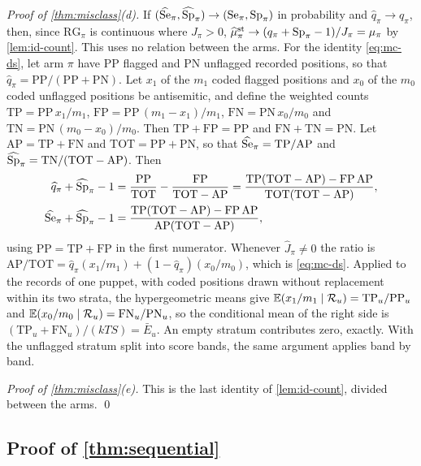 \emph{Proof of \cref{thm:misclass}(d).} If $(\widehat{\mathrm{Se}}_\pi,\widehat{\mathrm{Sp}}_\pi)\to(\mathrm{Se}_\pi,\mathrm{Sp}_\pi)$ in probability and $\widehat q_\pi\to q_\pi$, then, since $\mathrm{RG}_\pi$ is continuous where $J_\pi>0$, $\widehat\mu^{\mathrm{st}}_\pi\to(q_\pi+\mathrm{Sp}_\pi-1)/J_\pi=\mu_\pi$ by \cref{lem:id-count}. This uses no relation between the arms. For the identity \eqref{eq:mc-ds}, let arm $\pi$ have $\mathrm{PP}$ flagged and $\mathrm{PN}$ unflagged recorded positions, so that $\widehat q_\pi=\mathrm{PP}/(\mathrm{PP}+\mathrm{PN})$. Let $x_1$ of the $m_1$ coded flagged positions and $x_0$ of the $m_0$ coded unflagged positions be antisemitic, and define the weighted counts $\mathrm{TP}=\mathrm{PP}\,x_1/m_1$, $\mathrm{FP}=\mathrm{PP}\,(m_1-x_1)/m_1$, $\mathrm{FN}=\mathrm{PN}\,x_0/m_0$ and $\mathrm{TN}=\mathrm{PN}\,(m_0-x_0)/m_0$. Then $\mathrm{TP}+\mathrm{FP}=\mathrm{PP}$ and $\mathrm{FN}+\mathrm{TN}=\mathrm{PN}$. Let $\mathrm{AP}=\mathrm{TP}+\mathrm{FN}$ and $\mathrm{TOT}=\mathrm{PP}+\mathrm{PN}$, so that $\widehat{\mathrm{Se}}_\pi=\mathrm{TP}/\mathrm{AP}$ and $\widehat{\mathrm{Sp}}_\pi=\mathrm{TN}/(\mathrm{TOT}-\mathrm{AP})$. Then
\begin{align*}
  \widehat q_\pi+\widehat{\mathrm{Sp}}_\pi-1&=\frac{\mathrm{PP}}{\mathrm{TOT}}-\frac{\mathrm{FP}}{\mathrm{TOT}-\mathrm{AP}}=\frac{\mathrm{TP}(\mathrm{TOT}-\mathrm{AP})-\mathrm{FP}\,\mathrm{AP}}{\mathrm{TOT}(\mathrm{TOT}-\mathrm{AP})},\\
  \widehat{\mathrm{Se}}_\pi+\widehat{\mathrm{Sp}}_\pi-1&=\frac{\mathrm{TP}(\mathrm{TOT}-\mathrm{AP})-\mathrm{FP}\,\mathrm{AP}}{\mathrm{AP}(\mathrm{TOT}-\mathrm{AP})},
\end{align*}
using $\mathrm{PP}=\mathrm{TP}+\mathrm{FP}$ in the first numerator. Whenever $\widehat J_\pi\neq0$ the ratio is $\mathrm{AP}/\mathrm{TOT}=\widehat q_\pi(x_1/m_1)+(1-\widehat q_\pi)(x_0/m_0)$, which is \eqref{eq:mc-ds}. Applied to the records of one puppet, with coded positions drawn without replacement within its two strata, the hypergeometric means give $\mathbb{E}(x_1/m_1\mid\mathcal R_u)=\mathrm{TP}_u/\mathrm{PP}_u$ and $\mathbb{E}(x_0/m_0\mid\mathcal R_u)=\mathrm{FN}_u/\mathrm{PN}_u$, so the conditional mean of the right side is $(\mathrm{TP}_u+\mathrm{FN}_u)/(kTS)=\bar E_u$. An empty stratum contributes zero, exactly. With the unflagged stratum split into score bands, the same argument applies band by band.

\emph{Proof of \cref{thm:misclass}(e).} This is the last identity of \cref{lem:id-count}, divided between the arms.
\qed

\subsection{Proof of \texorpdfstring{\cref{thm:sequential}}{the validity of Algorithm 1}}\label{app:pf-sequential}

